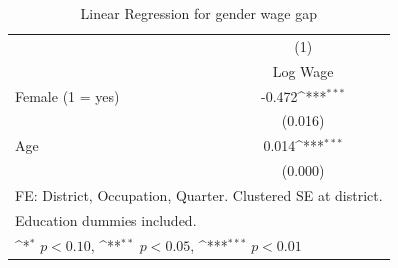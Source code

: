 \begin{table}[htbp]\centering
\def\sym#1{\ifmmode^{#1}\else\(^{#1}\)\fi}
\caption{Linear Regression for gender wage gap}
\begin{tabular*}{0.6\hsize}{@{\hskip\tabcolsep\extracolsep\fill}l*{1}{c}}
\toprule
                &\multicolumn{1}{c}{(1)}\\
                &\multicolumn{1}{c}{Log Wage}\\
\midrule
Female (1 = yes)&   -0.472\sym{***}\\
                &  (0.016)         \\
\addlinespace
Age             &    0.014\sym{***}\\
                &  (0.000)         \\
\bottomrule
\multicolumn{2}{l}{\footnotesize FE: District, Occupation, Quarter. Clustered SE at district.}\\
\multicolumn{2}{l}{\footnotesize Education dummies included.}\\
\multicolumn{2}{l}{\footnotesize \sym{*} \(p<0.10\), \sym{**} \(p<0.05\), \sym{***} \(p<0.01\)}\\
\end{tabular*}
\end{table}
